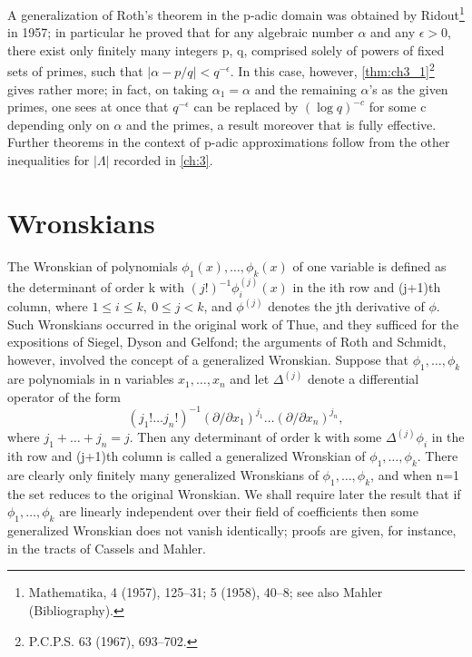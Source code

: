 A generalization of Roth's theorem in the p-adic domain was obtained by Ridout\footnote{Mathematika, 4 (1957), 125--31; 5 (1958), 40--8; see also Mahler (Bibliography).} in 1957; in particular he proved that for any algebraic number  $\alpha$  and any  $\epsilon > 0$, there exist only finitely many integers p, q, comprised solely of powers of fixed sets of primes, such that  $|\alpha - p/q| < q^{-\epsilon}$. In this case, however, \autoref{thm:ch3_1}\footnote{P.C.P.S. 63 (1967), 693--702.} gives rather more; in fact, on taking  $\alpha_1 = \alpha$  and the remaining  $\alpha$'s as the given primes, one sees at once that  $q^{-\epsilon}$  can be replaced by  $(\log q)^{-c}$  for some c depending only on  $\alpha$  and the primes, a result moreover that is fully effective. Further theorems in the context of p-adic approximations follow from the other inequalities for  $|\Lambda|$  recorded in \autoref{ch:3}.

\section{Wronskians}\label{sec:ch7_2}

The Wronskian of polynomials  $\phi_1(x), \ldots, \phi_k(x)$  of one variable is defined as the determinant of order k with  $(j!)^{-1}\phi_i^{(j)}(x)$  in the ith row and (j+1)th column, where  $1 \leq i \leq k, \ 0 \leq j < k$, and  $\phi^{(j)}$  denotes the jth derivative of  $\phi$. Such Wronskians occurred in the original work of Thue, and they sufficed for the expositions of Siegel, Dyson and Gelfond; the arguments of Roth and Schmidt, however, involved the concept of a generalized Wronskian. Suppose that  $\phi_1, \ldots, \phi_k$  are polynomials in n variables  $x_1, \ldots, x_n$  and let  $\Delta^{(j)}$  denote a differential operator of the form
\[(j_1!\ldots j_n!)^{-1}(\partial/\partial x_1)^{j_1}\ldots(\partial/\partial x_n)^{j_n},\]
where  $j_1 + \ldots + j_n = j$. Then any determinant of order k with some  $\Delta^{(j)}\phi_i$  in the ith row and (j+1)th column is called a generalized Wronskian of  $\phi_1, \ldots, \phi_k$. There are clearly only finitely many generalized Wronskians of  $\phi_1, \ldots, \phi_k$, and when n=1 the set reduces to the original Wronskian. We shall require later the result that if  $\phi_1, \ldots, \phi_k$  are linearly independent over their field of coefficients then some generalized Wronskian does not vanish identically; proofs are given, for instance, in the tracts of Cassels and Mahler.

